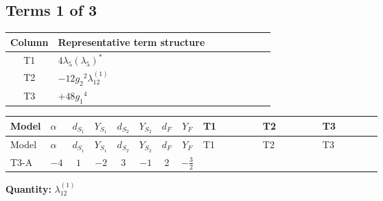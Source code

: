 \documentclass[8pt]{article}
\begin{document}
\begin{landscape}
\subsection*{Terms 1 of 3}
\begin{center}
\begin{tabular}{@{}c >{\raggedright\arraybackslash}p{0.82\linewidth}@{}}
\toprule
Column & Representative term structure \\
\midrule
T1 & \(\displaystyle 4 {\lambda_5} \left({\lambda_5}\right)^{*}\) \\
\midrule
T2 & \(\displaystyle -12 {g_2}^2 {\lambda_{12}^{(1)}}\) \\
\midrule
T3 & \(\displaystyle +48 {g_1}^4\) \\
\midrule
\bottomrule
\end{tabular}
\end{center}
\smallskip
\tiny
\begin{longtable}{@{}llcccccc >{\raggedright\arraybackslash}p{0.21\linewidth} >{\raggedright\arraybackslash}p{0.21\linewidth} >{\raggedright\arraybackslash}p{0.21\linewidth}@{}}
\toprule
Model & $\alpha$ & $d_{S_1}$ & $Y_{S_1}$ & $d_{S_2}$ & $Y_{S_2}$ & $d_F$ & $Y_F$ & T1 & T2 & T3 \\
\midrule
\endfirsthead
\toprule
Model & $\alpha$ & $d_{S_1}$ & $Y_{S_1}$ & $d_{S_2}$ & $Y_{S_2}$ & $d_F$ & $Y_F$ & T1 & T2 & T3 \\
\midrule
\endhead
T3-A & $-4$ & $1$ & $-2$ & $3$ & $-1$ & $2$ & $-\frac{3}{2}$ & \scriptsize\adjustbox{max width=\linewidth}{$\begin{gathered} 4 {\lambda_5} \left({\lambda_5}\right)^{*}\end{gathered}$} & \scriptsize\adjustbox{max width=\linewidth}{$\begin{gathered} -12 {g_2}^2 {\lambda_{12}^{(1)}}\end{gathered}$} & \scriptsize\adjustbox{max width=\linewidth}{$\begin{gathered} +48 {g_1}^4\end{gathered}$} \\
\midrule
\bottomrule
\end{longtable}
\clearpage
\noindent\textbf{Quantity: }$\lambda_{12}^{(1)}$\par\smallskip

\end{landscape}
\end{document}
